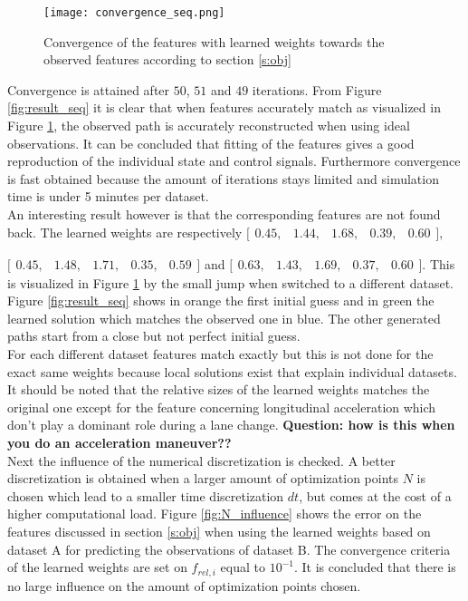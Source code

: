 \begin{figure}[h!]
	\centering
	\texttt{[image: convergence\_seq.png]}
	\caption{Convergence of the features with learned weights towards the observed features according to section \ref{s:obj}}
	\label{fig:convergence_seq}
\end{figure}

Convergence is attained after $50$, $51$ and $49$ iterations. From Figure \ref{fig:result_seq} it is clear that when features accurately match as visualized in Figure \ref{fig:convergence_seq}, the observed path is accurately reconstructed when using ideal observations. It can be concluded that fitting of the features gives a good reproduction of the individual state and control signals. Furthermore convergence is fast obtained because the amount of iterations stays limited and simulation time is under 5 minutes per dataset.\\

 An interesting result however is that the corresponding features are not found back. The learned weights are respectively $\bigl[ \begin{smallmatrix} 0.45  ,&1.44 ,&1.68 ,&0.39,&0.60\end{smallmatrix}\bigr]$, 
 
 $\bigl[ \begin{smallmatrix} 0.45  ,&1.48 ,&1.71 ,&0.35,&0.59\end{smallmatrix}\bigr]$ and $\bigl[ \begin{smallmatrix} 0.63  ,&1.43 ,&1.69 ,&0.37,&0.60\end{smallmatrix}\bigr]$. This is visualized in Figure \ref{fig:convergence_seq} by the small jump when switched to a different dataset. Figure \ref{fig:result_seq} shows in orange the first initial guess and in green the learned solution which matches the observed one in blue. The other generated paths start from a close but not perfect initial guess.\\
 
 For each different dataset features match exactly but this is not done for the exact same weights because local solutions exist that explain individual datasets. It should be noted that the relative sizes of the learned weights matches the original one except for the feature concerning longitudinal acceleration which don't play a dominant role during a lane change. \textbf{Question: how is this when you do an acceleration maneuver??}\\
 
 Next the influence of the numerical discretization is checked. A better discretization is obtained when a larger amount of optimization points $N$ is chosen which lead to a smaller time discretization $dt$, but comes at the cost of a higher computational load. Figure \ref{fig:N_influence} shows the error on the features discussed in section \ref{s:obj} when using the learned weights based on dataset A for predicting the observations of dataset B. The convergence criteria of the learned weights are set on $f_{rel,i}$ equal to $10^{-1}$. It is concluded that there is no large influence on the amount of optimization points chosen.\\
 
